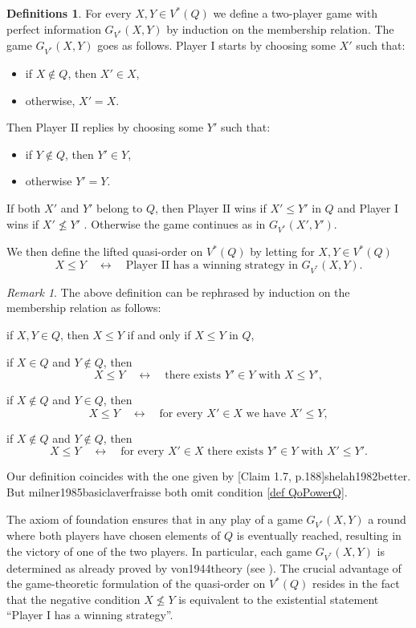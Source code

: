 \documentclass{article}%
\newcommand\textcite{}
\newcommand\textcites{}
\theoremstyle{plain}
\theoremstyle{definition}
\newtheorem{definition}[theorem]{Definition}
\newtheorem{definition}[theorem]{Notation}
\newtheorem{definition}[theorem]{Notations}
\newtheorem{definition}[theorem]{Definitions}
\theoremstyle{remark}
\newtheorem{remark}[theorem]{Remark}
\newcommand{\PowerQ}{V^{*}}
\newcommand{\GPowerQ}{G_{V^{*}}}
\newcommand{\SSI}{\quad\longleftrightarrow\quad} %
\newcommand{\I}{\mathrm{I}}
\newcommand{\II}{\mathrm{II}}
\begin{document}
\begin{definition}
For every $X,Y\in\PowerQ(Q)$ we define a two-player game with perfect information $\GPowerQ (X,Y)$ by induction on the membership relation. The game $\GPowerQ (X,Y)$ goes as follows. Player $\I$ starts by choosing some $X'$ such that:
\begin{itemize}
\item if $X\notin Q$, then $X'\in X$,
\item otherwise, $X'=X$.
\end{itemize}
Then Player $\II$ replies by choosing some $Y'$ such that:
\begin{itemize}
\item if $Y\notin Q$, then $Y'\in Y$,
\item otherwise $Y'=Y$.
\end{itemize}
If both $X'$ and $Y'$ belong to $Q$, then Player $\II$ wins if $X'\leq Y'$ in $Q$ and Player $\I$ wins if $X'\nleq Y'$ . Otherwise the game continues as in $\GPowerQ (X',Y')$. 
\end{definition}

We then define the lifted quasi-order on $\PowerQ(Q)$ by letting for $X,Y\in\PowerQ(Q)$
\[
X\leq Y \SSI \text{Player $\II$ has a winning strategy in $\GPowerQ (X,Y)$.}
\]

\begin{remark}\label{rem PowerDownset}
The above definition can be rephrased by induction on the membership relation as follows:
\begin{enumDefn}
\item if $X,Y\in Q$, then $X\leq Y$ if and only if $X\leq Y$ in $Q$,
\item if $X\in Q$ and $Y\notin Q$, then 
\[
X\leq Y \SSI \text{there exists $Y'\in Y$ with $X\leq Y'$},
\]
\item if $X\notin Q$ and $Y\in Q$, then \label{def QoPowerQ}
\[
X\leq Y \SSI \text{for every $X'\in X$ we have $X'\leq Y$},
\]
\item if $X\notin Q$ and $Y\notin Q$, then 
\[
X\leq Y \SSI \text{for every $X'\in X$ there exists $Y'\in Y$ with $X'\leq Y'$}.
\]
\end{enumDefn}
Our definition coincides with the one given by \textcite[Claim 1.7, p.188]{shelah1982better}. But  \textcites{milner1985basic}{laverfraisse} both omit condition \cref{def QoPowerQ}. 
\end{remark}


The axiom of foundation ensures that in any play of a game $\GPowerQ (X,Y)$ a round where both players have chosen elements of $Q$ is eventually reached, resulting in the victory of one of the two players. In particular, each game $\GPowerQ (X,Y)$ is determined as already proved by \textcite{von1944theory} (see \cite[(20.1)]{kechris1995classical}).
The crucial advantage of the game-theoretic formulation of the quasi-order on $\PowerQ(Q)$ resides in the fact that the negative condition $X\nleq Y$ is equivalent to the existential statement \enquote{Player $\I$ has a winning strategy}. 
\end{document}
